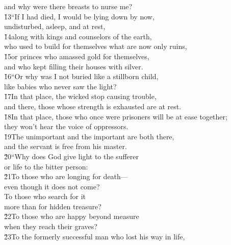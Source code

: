 \begin{poetry}
\poemll    and why were there breasts to nurse me? \\
\poeml \v{13}``If I had died, I would be lying down by now, \\
\poemll    undisturbed, asleep, and at rest, \\
\poeml \v{14}along with kings and counselors of the earth, \\
\poemll    who used to build for themselves what are now only ruins, \\
\poeml \v{15}or princes who amassed gold for themselves, \\
\poemll    and who kept filling their houses with silver. \\
\poeml \v{16}``Or why was I not buried like a stillborn child, \\
\poemll    like babies who never saw the light? \\
\poeml \v{17}In that place, the wicked stop causing trouble, \\
\poemll    and there, those whose strength is exhausted are at rest. \\
\poeml \v{18}In that place, those who once were prisoners will be at ease together; \\
\poemll    they won't hear the voice of oppressors. \\
\poeml \v{19}The unimportant and the important are both there, \\
\poemll    and the servant is free from his master. \\
\poeml \v{20}``Why does God give light to the sufferer \\
\poemll    or life to the bitter person: \\
\poeml \v{21}To those who are longing for death--- \\
\poemll    even though it does not come? \\
\poeml To those who search for it \\
\poemll    more than for hidden treasure? \\
\poeml \v{22}To those who are happy beyond measure \\
\poemll    when they reach their graves? \\
\poeml \v{23}To the formerly successful man who lost his way in life, \\

\end{poetry}
